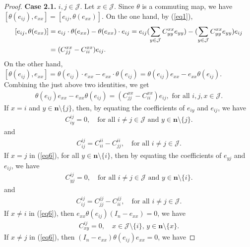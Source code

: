\documentclass[10pt,a4paper]{amsart}
\begin{document}
\begin{proof}
\textbf{Case 2.1.} $ i,j \in \mathcal{J} $. Let $ x \in \mathcal{J} $. Since $ \theta $ is a commuting map, we have $ [\theta(e_{ij}), e_{xx}] = [e_{ij}, \theta(e_{xx})] $.
On the one hand, by (\ref{eq1}), 
\[
\begin{aligned} 
\relax[e_{ij},\theta(e_{xx})]&= e_{ij}\cdot \theta(e_{xx})-\theta(e_{xx})\cdot  e_{ij} = e_{ij} ( \sum_{y \in \mathcal{J}} C_{yy}^{xx} e_{yy})-(\sum_{y \in \mathcal{J}} C_{yy}^{xx} e_{yy}) e_{ij} \\
&= ( C_{jj}^{xx} - C_{ii}^{xx} ) e_{ij}.
\end{aligned}
\]
On the other hand, 
$
[\theta(e_{ij}), e_{xx}] = \theta(e_{ij}) \cdot  e_{xx} - e_{xx} \cdot  \theta(e_{ij}) = \theta(e_{ij}) e_{xx} - e_{xx} \theta(e_{ij}).
$
Combining the just above two identities, we get  
 \begin{align}\label{eq6}
 \theta(e_{ij}) e_{xx} - e_{xx} \theta(e_{ij}) = \left( C_{jj}^{xx} - C_{ii}^{xx} \right) e_{ij},   \text{ for all }  i, j,x \in \mathcal{J}.
 \end{align}
If $ x = i $ and $ y \in \mathbf{n} \setminus \{j\} $, then, by equating the coefficients of $ e_{iy} $ and $ e_{ij} $, we have 
 \begin{align}\label{eq7}
 C_{iy}^{ij} = 0, \quad \text{for all } i \neq j \in \mathcal{J} \text{ and } y \in \mathbf{n} \setminus \{j\}.
 \end{align}
and 
 \begin{align}\label{eq8}
C_{ij}^{ij} = C_{ii}^{ii} - C_{jj}^{ii}, \quad \text{for all } i \neq j \in \mathcal{J}. 
\end{align}
If $ x = j $ in (\ref{eq6}), for all $ y \in \mathbf{n} \setminus \{i\} $, then  by equating the coefficients of $ e_{yj} $ and $ e_{ij} $, we have 
 \begin{align}\label{eq9}
C_{yj}^{ij} = 0, \quad \text{for all } i \neq j \in \mathcal{J} \text{ and } y \in \mathbf{n} \setminus \{i\}. 
\end{align}
and 
 \begin{align}\label{eq10}
C_{ij}^{ij} = C_{jj}^{jj} - C_{ii}^{jj}, \quad \text{for all }  i \neq j \in \mathcal{J}. 
 \end{align}
If $ x \neq i $ in (\ref{eq6}), then $ e_{xx} \theta(e_{ij}) (I_n - e_{xx}) = 0 $, we have
 \begin{align}\label{eq11}
C_{xy}^{ij} = 0, \quad x \in \mathcal{J} \setminus \{i\}, \, y \in \mathbf{n} \setminus \{x\}.
\end{align}
If $ x \neq j $ in (\ref{eq6}), then $ (I_n - e_{xx}) \theta(e_{ij}) e_{xx} = 0 $, we have

\end{proof}
\end{document}

